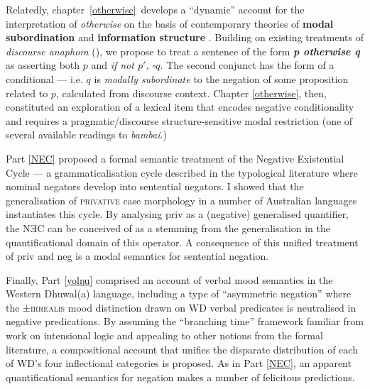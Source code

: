 \documentclass[12pt,dvipsnames]{report}
\begin{document}
Relatedly, chapter~\ref{otherwise}~develops a ``dynamic'' account for the interpretation of \textit{otherwise} on the basis of contemporary theories of \textbf{modal subordination} \citep{Roberts1989,Roberts2020,Roberts1995} and \textbf{information structure} \citep[\textit{e.g.},][]{Roberts2012}. Building on existing treatments of \textit{discourse anaphora} (\citealt{Webber2001,Kruijff-Korbayova2001}), we propose to treat a sentence of the form \textbf{\textit{p otherwise q}} as asserting both $ p $ and \textit{if not $ p' $, $ \square q $}. The second conjunct has the form of a conditional --- i.e. $ q $ is \textit{modally subordinate} to the negation of some proposition related to $ p $, calculated from discourse context. Chapter \ref{otherwise}, then, constituted an exploration of a lexical item that encodes negative conditionality and requires a pragmatic/discourse structure-sensitive modal restriction (one of several available readings to \textit{bambai}.)

Part \ref{NEC} proposed a formal semantic treatment of the Negative Existential Cycle --- a grammaticalisation cycle described in the typological literature where nominal negators develop into sentential negators. I showed that the generalisation of \textsc{privative} case morphology in a number of Australian languages instantiates this cycle. By analysing \gls{priv} as a (negative) generalised quantifier, the NƎC can be conceived of as a stemming from the generalisation in the quantificational domain of this operator. A consequence of this unified treatment of \gls{priv} and \gls{neg} is a modal semantics for sentential negation.

Finally, Part \ref{yolŋu} comprised an account of verbal mood semantics in the Western Dhuwal(a) language, including a type of ``asymmetric negation'' where the ±\textsc{irrealis} mood distinction drawn on WD verbal predicates is neutralised in negative predications. By assuming the ``branching time'' framework familiar from work on intensional logic and appealing to other notions from the formal literature, a compositional account that unifies the disparate distribution of each of WD's four inflectional categories is proposed. As in Part \ref{NEC}, an apparent quantificational semantics for negation makes a number of felicitous predictions.
\end{document}
